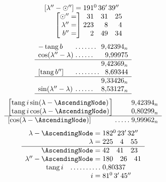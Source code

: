 \[
\begin{array}{r@{\;}l}
[\lambda''-\odot'']=&191^{0}\,36'\,39''\\
\left[\begin{array}{@{}r@{}}\odot''=\\\lambda''=\\b''=\end{array}\right]&
\begin{array}{@{}r@{\quad}r@{\quad}r@{}}31&31&25\\223&8&4\\2&49&34\end{array}
\end{array}
\]
\[
\begin{array}{l@{\;}l@{\;}r}
-\operatorname{tang}b&\mathord{.}\,\mathord{.}\,\mathord{.}\,\mathord{.}\,\mathord{.}\,\mathord{.}\,\mathord{.}&9{,}42394_n\\
\cos(\lambda''-\lambda)&\mathord{.}\,\mathord{.}\,\mathord{.}\,\mathord{.}\,\mathord{.}\,\mathord{.}&9{,}99975\\\hline
&&9{,}42369_n\\
{}[\operatorname{tang}b'']&\mathord{.}\,\mathord{.}\,\mathord{.}\,\mathord{.}\,\mathord{.}\,\mathord{.}\,\mathord{.}\,\mathord{.}&8{,}69344\\\hline
&&9{,}33426_n\\
\sin(\lambda''-\lambda)&\mathord{.}\,\mathord{.}\,\mathord{.}\,\mathord{.}\,\mathord{.}\,\mathord{.}&8{,}53127_n\\\hline
\end{array}
\]
\[
\begin{array}{l@{\;}l@{\;}r}
\left[\begin{array}{@{}l@{}}\operatorname{tang}i\sin(\lambda-\AscendingNode)\\\operatorname{tang}i\cos(\lambda-\AscendingNode)\end{array}\right]&&
\begin{array}{@{}r@{}}9{,}42394_n\\0{,}80299_n\end{array}\\\hline
[\cos(\lambda-\AscendingNode)]&\mathord{.}\,\mathord{.}\,\mathord{.}\,\mathord{.}\,\mathord{.}&9{,}99962_n
\end{array}
\]
\[
\begin{array}{r@{\;}l}
\lambda-\AscendingNode=&182^{0}\,23'\,32''\\
\lambda=&225\quad4\quad55\\\hline
\AscendingNode=&42\quad41\quad23\\
\lambda''-\AscendingNode=&180\quad26\quad41\\
\operatorname{tang}i\quad\mathord{.}\,\mathord{.}\,\mathord{.}\,\mathord{.}\,\mathord{.}\,\mathord{.}\,\mathord{.}\,\mathord{.}\,\mathord{.}\,\mathord{.}&0{,}80337\\
i=&81^{0}\,3'\,45''
\end{array}
\]
